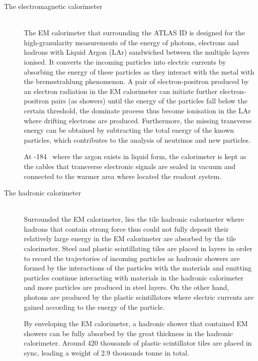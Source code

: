 \documentclass[UTF8,12pt]{ctexart}
\numberwithin{equation}{section}
\begin{document}
\begin{description}
	\item[The electromagnetic calorimeter] \mbox{} \\
The EM calorimeter that surrounding the ATLAS ID is designed for the high-granularity measurements of the energy of photons, electrons and hadrons with Liquid Argon (LAr) sandwiched between the multiple layers ionised. It converts the incoming particles into electric currents by absorbing the energy of these particles as they interact with the metal with the bremsstrahlung phenomenon. A pair of electron-positron produced by an electron radiation in the EM calorimeter can initiate further electron-positron pairs (as showers) until the energy of the particles fall below the certain threshold, the dominate process thus become ionisation in the LAr where drifting electrons are produced. Furthermore, the missing transverse energy can be obtained by subtracting the total energy of the known particles, which contributes to the analysis of neutrinos and new particles.

At -184 \textcelsius~where the argon exists in liquid form, the calorimeter is kept as the cables that transverse electronic signals are sealed in vacuum and connected to the warmer area where located the readout system.




\item[The hadronic calorimeter] \mbox{} \\
Surrounded the EM calorimeter, lies the tile hadronic calorimeter where hadrons that contain strong force thus could not fully deposit their relatively large energy in the EM calorimeter are absorbed by the tile calorimeter. Steel and plastic scintillating tiles are placed in layers in order to record the trajectories of incoming particles as hadronic showers are formed by the interactions of the particles with the materials and emitting particles continue interacting with materials in the hadronic calorimeter and more particles are produced in steel layers. On the other hand, photons are produced by the plastic scintillators where electric currents are gained according to the energy of the particle.

By enveloping the EM calorimeter, a hadronic shower that contained EM showers can be fully absorbed by the great thickness in the hadronic calorimeter. Around 420 thousands of plastic scintillator tiles are placed in sync, leading a weight of 2.9 thousands tonne in total.


\end{description}
\end{document}
